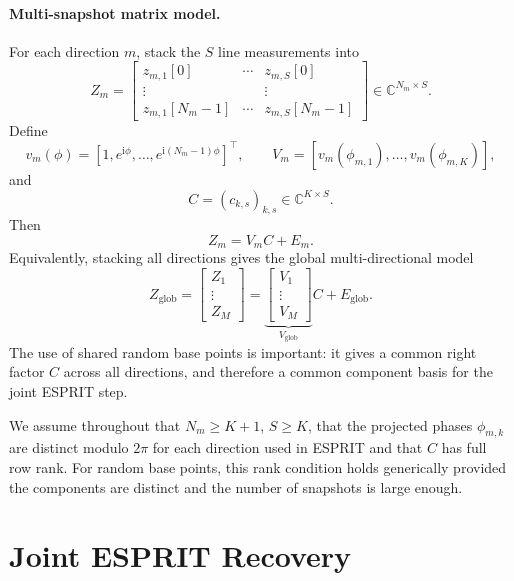 \documentclass[sigconf,natbib=true,anonymous=true,review=true]{acmart}
\newcommand{\C}{\mathbb{C}}
\newcommand{\jj}{\mathrm{i}}
\begin{document}
\paragraph{Multi-snapshot matrix model.}
For each direction $m$, stack the $S$ line measurements into
\[
    Z_m
    =
    \begin{bmatrix}
    z_{m,1}[0] & \cdots & z_{m,S}[0] \\
    \vdots    &        & \vdots \\
    z_{m,1}[N_m-1] & \cdots & z_{m,S}[N_m-1]
    \end{bmatrix}
    \in\C^{N_m\times S}.
\]
Define
\[
    v_m(\phi)
    =
    [1,e^{\jj\phi},\ldots,e^{\jj(N_m-1)\phi}]^\top,
    \qquad
    V_m
    =
    [v_m(\phi_{m,1}),\ldots,v_m(\phi_{m,K})],
\]
and
\[
    C
    =
    (c_{k,s})_{k,s}
    \in\C^{K\times S}.
\]
Then
\begin{equation}
    Z_m
    =
    V_m C + E_m.
    \label{eq:direction_matrix_model}
\end{equation}
Equivalently, stacking all directions gives the global multi-directional model
\begin{equation}
    Z_{\mathrm{glob}}
    =
    \begin{bmatrix}
        Z_1\\
        \vdots\\
        Z_M
    \end{bmatrix}
    =
    \underbrace{
    \begin{bmatrix}
        V_1\\
        \vdots\\
        V_M
    \end{bmatrix}}_{V_{\mathrm{glob}}}
    C
    +
    E_{\mathrm{glob}}.
    \label{eq:global_matrix_model}
\end{equation}
The use of shared random base points is important: it gives a common right factor $C$ across all directions, and therefore a common component basis for the joint ESPRIT step.

We assume throughout that $N_m\ge K+1$, $S\ge K$, %
that the projected phases \(\phi_{m,k}\) are distinct modulo \(2\pi\) for each direction used in ESPRIT and that
$C$ has full row rank. For random base points, this rank condition holds generically provided the components are distinct and the number of snapshots is large enough.

\section{Joint ESPRIT Recovery}
\end{document}
